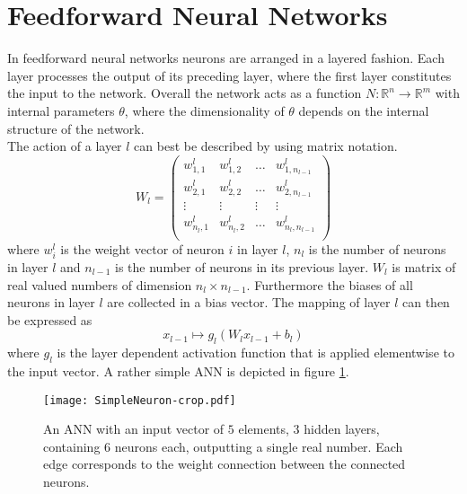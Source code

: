 \section{Feedforward Neural Networks}
\label{sec:ANN}
In feedforward neural networks neurons are arranged in a layered fashion. Each layer processes the output of its preceding layer, where the first layer constitutes the input to the network. Overall the network acts as a function $N: \mathbb{R}^n \rightarrow \mathbb{R}^m$ with internal parameters $\theta$, where the dimensionality of $\theta$ depends on the internal structure of the network.\\

The action of a layer $l$ can best be described by using matrix notation. 
\begin{equation}
W_l = 
\begin{pmatrix}
w_{1,1}^l & w_{1,2}^l & \dots & w_{1,n_{l-1}}^l \\
w_{2,1}^l & w_{2,2}^l & \dots & w_{2,n_{l-1}}^l \\
\vdots & \vdots & \vdots & \vdots \\
w_{n_l,1}^l & w_{n_l,2}^l & \dots & w_{n_l,n_{l-1}}^l \\
\end{pmatrix}
\end{equation}
where $w_i^l$ is the weight vector of neuron $i$ in layer $l$, $n_l$ is the number of neurons in layer $l$ and $n_{l-1}$ is the number of neurons in its previous layer. $W_l$ is matrix of real valued numbers of dimension $n_l \times n_{l-1}$. Furthermore the biases of all neurons in layer $l$ are collected in a bias vector. The mapping of layer $l$ can then be expressed as 
\begin{equation}
x_{l-1} \mapsto g_l(W_l x_{l-1} + b_l)
\end{equation}
where $g_l$ is the layer dependent activation function that is applied elementwise to the input vector. A rather simple ANN is depicted in figure \ref{fig:ANN}. \\
\begin{figure}
\centering
  \texttt{[image: SimpleNeuron-crop.pdf]}
  \caption{An ANN with an input vector of $5$ elements, $3$ hidden layers, containing $6$ neurons each, outputting a single real number. Each edge corresponds to the weight connection between the connected neurons. }
  \label{fig:ANN}
\end{figure}


